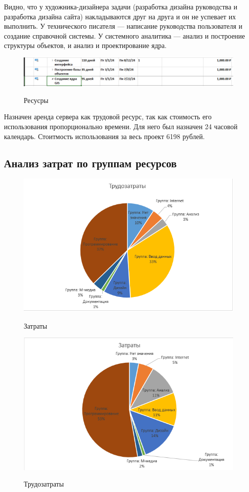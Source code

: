 Видно, что у художника-дизайнера задачи (разработка дизайна руководства и разработка дизайна сайта) накладываются друг на друга и он не успевает их выполнить.
У технического писателя --- написание руководства пользователя и создание справочной системы.
У системного аналитика --- анализ и построение структуры объектов, и анализ и проектирование ядра.

\begin{figure}[ht!]
	\includegraphics[width=0.75\linewidth]{assets/images/image_2024-02-27_09-35-44.png}
	\label{fig:r2}
	\caption{Ресусры}
\end{figure}
\FloatBarrier

Назначен аренда сервера как трудовой ресурс, так как стоимость его использования пропорционально времени.
Для него был назначен 24 часовой календарь. Стоитмость использования за весь проект 6198 рублей.

\subsection{Анализ затрат по группам ресурсов}

\begin{figure}[ht!]
	\includegraphics[width=0.75\linewidth]{assets/images/image_2024-02-27_11-32-35.png}
	\label{fig:r2}
	\caption{Затраты}
\end{figure}
\FloatBarrier

\begin{figure}[ht!]
	\includegraphics[width=0.75\linewidth]{assets/images/image_2024-02-27_11-33-30.png}
	\label{fig:r2}
	\caption{Трудозатраты}
\end{figure}
\FloatBarrier

